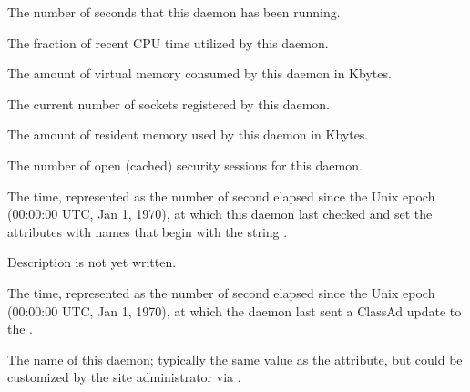 \begin{description}
\item[\AdAttr{MonitorSelfAge}:] The number of seconds that this daemon
  has been running.

\item[\AdAttr{MonitorSelfCPUUsage}:] The fraction of recent CPU time utilized
  by this daemon. 

\item[\AdAttr{MonitorSelfImageSize}:] The amount of virtual memory consumed by
  this daemon in Kbytes.

\item[\AdAttr{MonitorSelfRegisteredSocketCount}:] The current number of sockets
  registered by this daemon.

\item[\AdAttr{MonitorSelfResidentSetSize}:] The amount of resident memory
  used by this daemon in Kbytes.

\item[\AdAttr{MonitorSelfSecuritySessions}:] The number of open (cached)
  security sessions for this daemon.

\item[\AdAttr{MonitorSelfTime}:] The  time, represented as the number of
  second elapsed since the Unix epoch (00:00:00 UTC, Jan 1, 1970),
  at which this daemon last checked and set the attributes with names that
  begin with the string .
  
\item[\AdAttr{MyAddress}:] Description is not yet written.

\item[\AdAttr{MyCurrentTime}:]  The time, represented as the number of 
  second elapsed since the Unix epoch (00:00:00 UTC, Jan 1, 1970),
  at which the  daemon last sent a ClassAd update to the
  .

\item[\AdAttr{Name}:] The name of this daemon; typically the same value as
  the  attribute, but could be customized by the site
  administrator via .


\end{description}
